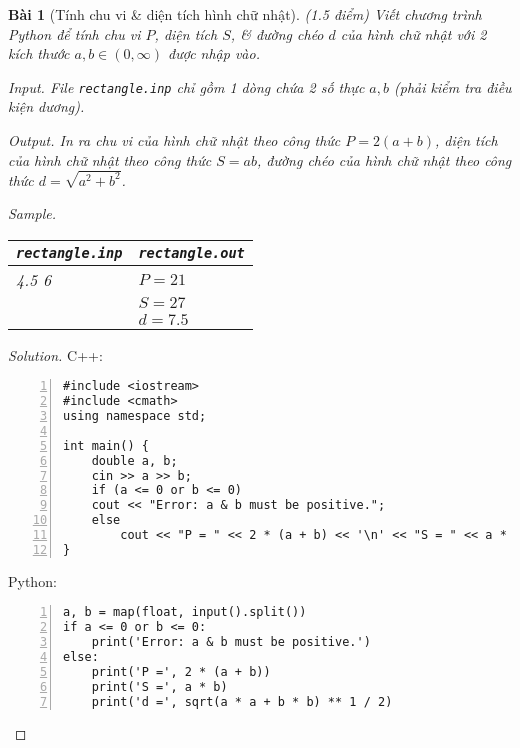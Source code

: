 \documentclass{article}
\newtheorem{baitoan}{Bài}
\begin{document}
\begin{baitoan}[Tính chu vi \& diện tích hình chữ nhật]
	{\rm(1.5 điểm)} Viết chương trình Python để tính chu vi $P$, diện tích $S$, \& đường chéo $d$ của hình chữ nhật với 2 kích thước $a,b\in(0,\infty)$ được nhập vào.
	\item {\sf Input.} File {\tt rectangle.inp} chỉ gồm 1 dòng chứa 2 số thực $a,b$ (phải kiểm tra điều kiện dương).
	\item {\sf Output.} In ra chu vi của hình chữ nhật theo công thức $P = 2(a + b)$, diện tích của hình chữ nhật theo công thức $S = ab$, đường chéo của hình chữ nhật theo công thức $d = \sqrt{a^2 + b^2}$.
	\item {\sf Sample.}
	\begin{table}[H]
		\centering
		\begin{tabular}{|l|l|}
			\hline
			\verb|rectangle.inp| & \verb|rectangle.out| \\
			\hline
			4.5 6 & $P = 21$ \\
            & $S = 27$ \\
            & $d = 7.5$ \\
			\hline
		\end{tabular}
	\end{table}
\end{baitoan}

\begin{proof}[Solution]
    C++:
    \begin{Verbatim}[numbers=left,xleftmargin=5mm]
#include <iostream>
#include <cmath>
using namespace std;

int main() {
    double a, b;
    cin >> a >> b;
    if (a <= 0 or b <= 0)
    cout << "Error: a & b must be positive.";
    else
        cout << "P = " << 2 * (a + b) << '\n' << "S = " << a * b << '\n' << "d = " << sqrt(a * a + b * b);		
}
\end{Verbatim}
    Python:
    \begin{Verbatim}[numbers=left,xleftmargin=5mm]
a, b = map(float, input().split())
if a <= 0 or b <= 0:
    print('Error: a & b must be positive.')
else:
    print('P =', 2 * (a + b))
    print('S =', a * b)
    print('d =', sqrt(a * a + b * b) ** 1 / 2)
    \end{Verbatim}
\end{proof}
\end{document}
